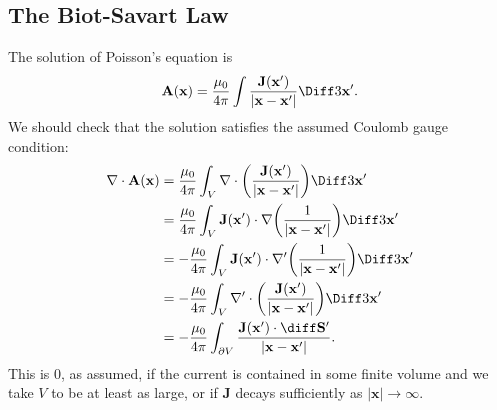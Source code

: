 \documentclass[12pt]{article}
\begin{document}
\subsection{The Biot-Savart Law}
\label{sub:the_biot_savart_law}

The solution of Poisson's equation is
\[
\mathbf{A}(\mathbf{x}) = \frac{\mu_0}{4 \pi} \int \frac{\mathbf{J}(\mathbf{x}')}{|\mathbf{x} - \mathbf{x}'|} \Diff3 \mathbf{x}'
.\]
We should check that the solution satisfies the assumed Coulomb gauge condition:
\begin{align*}
	\nabla \cdot \mathbf{A}(\mathbf{x}) &= \frac{\mu_0}{4 \pi} \int_{V} \nabla \cdot \biggl( \frac{\mathbf{J}(\mathbf{x}')}{|\mathbf{x} - \mathbf{x}'|} \biggr) \Diff3 \mathbf{x}' \\
					    &= \frac{\mu_0}{4 \pi} \int_{V} \mathbf{J}(\mathbf{x}') \cdot \nabla \biggl( \frac{1}{|\mathbf{x} - \mathbf{x}'|} \biggr) \Diff3 \mathbf{x}' \\
					    &= - \frac{\mu_0}{4 \pi} \int_{V} \mathbf{J}(\mathbf{x}') \cdot \nabla' \biggl( \frac{1}{|\mathbf{x} - \mathbf{x}'|} \biggr) \Diff3 \mathbf{x}' \\
					    &= - \frac{\mu_0}{4 \pi} \int_{V} \nabla' \cdot \biggl( \frac{\mathbf{J}(\mathbf{x}')}{|\mathbf{x} - \mathbf{x}'|} \biggr) \Diff3 \mathbf{x}' \\
					    &= - \frac{\mu_0}{4 \pi} \int_{\partial V} \frac{\mathbf{J}(\mathbf{x}') \cdot \diff \mathbf{S}'}{|\mathbf{x} - \mathbf{x}'|}.
\end{align*}
This is $0$, as assumed, if the current is contained in some finite volume and we take $V$ to be at least as large, or if $\mathbf{J}$ decays sufficiently as $|\mathbf{x}| \to \infty$.

\newpage

\printindex
\end{document}
